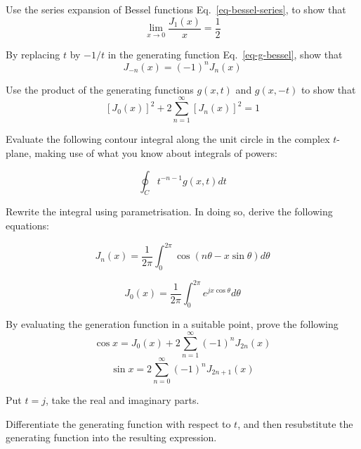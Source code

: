 \begin{exer}
Use the series expansion of Bessel functions Eq.~\ref{eq-bessel-series}, to show that
$$\lim_{x \to 0} \frac{J_1(x)}{x}= \frac{1}{2}$$
\end{exer}

\begin{exer}
By replacing $t$ by $-1/t$ in the generating function Eq.~\ref{eq-g-bessel}, show that
$$J_{-n}(x)=(-1)^nJ _n(x)$$
\end{exer}

\begin{exer}
Use the product of the generating functions $g(x,t)$ and $g(x,-t)$ to show that
$$\left[ J_0(x) \right]^2 + 2 \sum_{n=1}^\infty \left[ J_n(x) \right]^2 = 1 $$
\end{exer}

\pagebreak

\begin{exer}
Evaluate the following contour integral along the unit circle in the complex $t$-plane, making use of what you know about integrals of powers:

$$ \oint_C t^{-n-1} g(x,t) dt $$

Rewrite the integral using parametrisation. In doing so, derive the following equations:

$$J_n(x) = \frac {1}{2\pi} \int_0 ^ {2 \pi} \cos (n \theta - x \sin \theta ) d\theta $$

$$ J_0(x) =  \frac {1}{2\pi} \int_0 ^ {2 \pi}  e^{j x \cos \theta} d \theta $$
\end{exer}

\begin{exer}
By evaluating the generation function in a suitable point, prove the following
$$ \cos x =  J_0(x) + 2 \sum_{n=1}^\infty (-1)^n J_{2n}(x)  $$
$$ \sin x =  2 \sum_{n=0}^\infty (-1)^n J_{2n+1}(x)  $$
\begin{hnt}
Put $t=j$, take the real and imaginary parts.
\end{hnt}
\end{exer}


\pagebreak



\begin{cue}
Differentiate the generating function with respect to $t$, and then resubstitute the generating function into the resulting expression. 
\end{cue}

